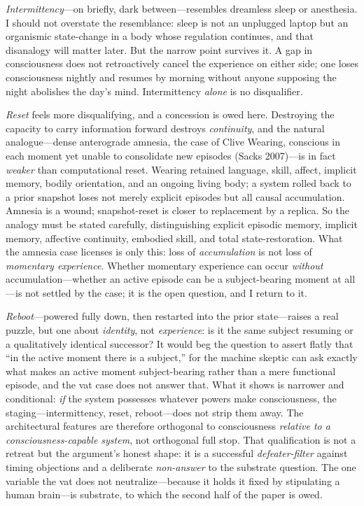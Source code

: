 \documentclass[11pt]{article}
\begin{document}
\emph{Intermittency}---on briefly, dark between---resembles dreamless sleep or anesthesia. I should not overstate the resemblance: sleep is not an unplugged laptop but an organismic state-change in a body whose regulation continues, and that disanalogy will matter later. But the narrow point survives it. A gap in consciousness does not retroactively cancel the experience on either side; one loses consciousness nightly and resumes by morning without anyone supposing the night abolishes the day's mind. Intermittency \emph{alone} is no disqualifier.

\emph{Reset} feels more disqualifying, and a concession is owed here. Destroying the capacity to carry information forward destroys \emph{continuity}, and the natural analogue---dense anterograde amnesia, the case of Clive Wearing, conscious in each moment yet unable to consolidate new episodes (Sacks 2007)---is in fact \emph{weaker} than computational reset. Wearing retained language, skill, affect, implicit memory, bodily orientation, and an ongoing living body; a system rolled back to a prior snapshot loses not merely explicit episodes but all causal accumulation. Amnesia is a wound; snapshot-reset is closer to replacement by a replica. So the analogy must be stated carefully, distinguishing explicit episodic memory, implicit memory, affective continuity, embodied skill, and total state-restoration. What the amnesia case licenses is only this: loss of \emph{accumulation} is not loss of \emph{momentary experience}. Whether momentary experience can occur \emph{without} accumulation---whether an active episode can be a subject-bearing moment at all---is not settled by the case; it is the open question, and I return to it.

\emph{Reboot}---powered fully down, then restarted into the prior state---raises a real puzzle, but one about \emph{identity}, not \emph{experience}: is it the same subject resuming or a qualitatively identical successor? It would beg the question to assert flatly that ``in the active moment there is a subject,'' for the machine skeptic can ask exactly what makes an active moment subject-bearing rather than a mere functional episode, and the vat case does not answer that. What it shows is narrower and conditional: \emph{if} the system possesses whatever powers make consciousness, the staging---intermittency, reset, reboot---does not strip them away. The architectural features are therefore orthogonal to consciousness \emph{relative to a consciousness-capable system}, not orthogonal full stop. That qualification is not a retreat but the argument's honest shape: it is a successful \emph{defeater-filter} against timing objections and a deliberate \emph{non-answer} to the substrate question. The one variable the vat does not neutralize---because it holds it fixed by stipulating a human brain---is substrate, to which the second half of the paper is owed.
\end{document}
